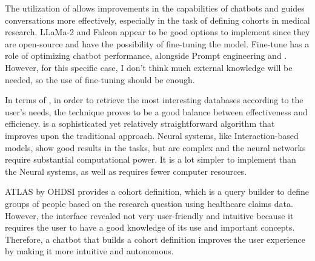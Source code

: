 The utilization of {\llm} allows improvements in the {\nlg} capabilities of chatbots and guides conversations more effectively, especially in the task of defining cohorts in medical research. LLaMa-2 and Falcon appear to be good options to implement since they are open-source and have the possibility of fine-tuning the model. Fine-tune has a role of optimizing chatbot performance, alongside Prompt engineering and {\rag}. However, for this specific case, I don't think much external knowledge will be needed, so the use of fine-tuning should be enough.

In terms of {\ir}, in order to retrieve the most interesting databases according to the user's needs, the {\bm} technique proves to be a good balance between effectiveness and efficiency. {\bm} is a sophisticated yet relatively straightforward algorithm that improves upon the traditional {\tfidf} approach. Neural {\ir} systems, like Interaction-based models, show good results in the {\ir} tasks, but are complex and the neural networks require substantial computational power. It is a lot simpler to implement than the Neural {\ir} systems, as well as requires fewer computer resources. 

ATLAS by OHDSI provides a cohort definition, which is a query builder to define groups of people based on the research question using healthcare claims data. However, the interface revealed not very user-friendly and intuitive because it requires the user to have a good knowledge of its use and important concepts. Therefore, a chatbot that builds a cohort definition improves the user experience by making it more intuitive and autonomous.


